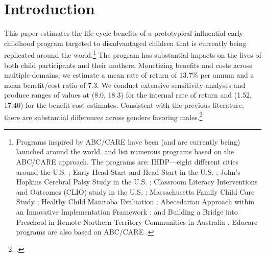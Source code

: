 \restoregeometry
\doublespacing

\setcounter{page}{0}

\section{Introduction}

This paper estimates the life-cycle benefits of a prototypical influential early childhood program targeted to disadvantaged children that is currently being replicated around the world.\footnote{Programs inspired by ABC/CARE have been (and are currently being) launched around the world. \citet{Sparling_2010_Highlights} and \citet{Ramey_Ramey_Lanzi_2014_Interventions} list numerous programs based on the ABC/CARE approach. The programs are: IHDP---eight different cities around the U.S. \citep{Spiker-etal_1997_Helping}; Early Head Start and Head Start in the U.S. \citep{Schneider_McDonald-eds_2007_Scale-Up_Vol-1}; John's Hopkins Cerebral Palsy Study in the U.S. \citep{Sparling_2010_Highlights}; Classroom Literacy Interventions and Outcomes (CLIO) study in the U.S. \citep{Sparling_2010_Highlights}; Massachusetts Family Child Care Study \citep{Collins_etal_2010_Massachusetts-Study}; Healthy Child Manitoba Evaluation \citep{Healthy_Child_Manitoba_2015_Starting-Early}; Abecedarian Approach within an Innovative Implementation Framework \citep{Jensen_Nielsen_2016_ABC-Programme-Pilot}; and Building a Bridge into Preschool in Remote Northern Territory Communities in Australia \citep{UMonash_Dataset_2015_URL}. Educare programs are also based on ABC/CARE \citep{Educare_2014_Research_Agenda,Yazejian_Bryant_2012_Educare}.} The program has substantial impacts on the lives of both child participants and their mothers. Monetizing benefits and costs across multiple domains, we estimate a mean rate of return of 13.7\% per annum and a mean benefit/cost ratio of 7.3. We conduct extensive sensitivity analyses and produce ranges of values at (8.0, 18.3) for the internal rate of return and (1.52, 17.40) for the benefit-cost estimates. Consistent with the previous literature, there are substantial differences across genders favoring males.\footnote{\cite{Garcia_Ziff_2017_Gender-Diff_UNPUBLISHED}.}

